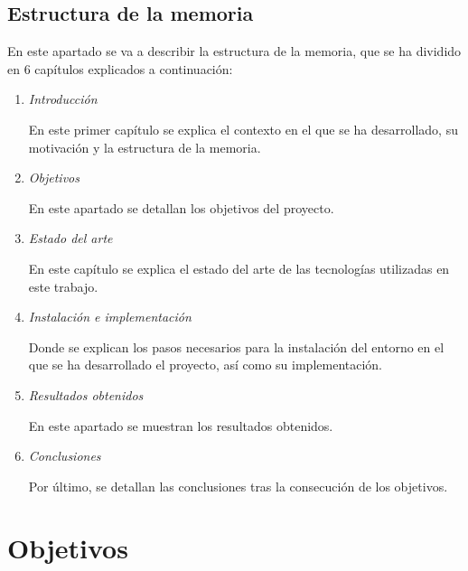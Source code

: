 \documentclass[a4paper, 12pt]{book}
\begin{document}
\section{Estructura de la memoria}
\label{sec:estructura}
En este apartado se va a describir la estructura de la memoria, que se ha dividido en 6 capítulos explicados a continuación:


\begin{enumerate}
    \item \emph{Introducción}
    
    En este primer capítulo se explica el contexto en el que se ha desarrollado, su motivación y la estructura de la memoria.
    
    \item \emph{Objetivos}
    
    En este apartado se detallan los objetivos del proyecto.
    
    \item \emph{Estado del arte}
    
    En este capítulo se explica el estado del arte de las tecnologías utilizadas en este trabajo. 
    
    \item \emph{Instalación e implementación}
    
    Donde se explican los pasos necesarios para la instalación del entorno en el que se ha desarrollado el proyecto, así como su implementación.

       \item \emph{Resultados obtenidos}
    
    En este apartado se muestran los resultados obtenidos.
    
        \item \emph{Conclusiones}
    
    Por último, se detallan las conclusiones tras la consecución de los objetivos.
    
 \end{enumerate}


\cleardoublepage %
\chapter{Objetivos} %
\label{chap:objetivos} %
\end{document}
